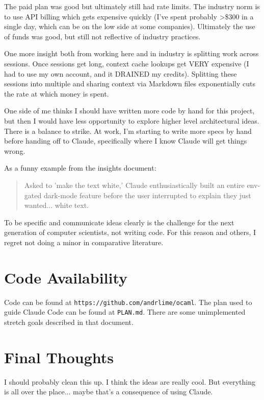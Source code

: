 \documentclass[sigconf]{acmart}
\begin{document}
The paid plan was good but ultimately still had rate limits. The industry norm is to use API billing which gets expensive quickly (I've spent probably >\$300 in a single day, which can be on the low side at some companies). Ultimately the use of funds was good, but still not reflective of industry practices.

One more insight both from working here and in industry is splitting work across sessions. Once sessions get long, context cache lookups get VERY expensive (I had to use my own account, and it DRAINED my credits). Splitting these sessions into multiple and sharing context via Markdown files exponentially cuts the rate at which money is spent.

One side of me thinks I should have written more code by hand for this project, but then I would have less opportunity to explore higher level architectural ideas. There is a balance to strike. At work, I'm starting to write more specs by hand before handing off to Claude, specifically where I know Claude will get things wrong.

As a funny example from the insights document:
\begin{quote}
  Asked to 'make the text white,' Claude enthusiastically built an entire env-gated dark-mode feature before the user interrupted to explain they just wanted... white text.
\end{quote}
To be specific and communicate ideas clearly is the challenge for the next generation of computer scientists, not writing code. For this reason and others, I regret not doing a minor in comparative literature.

\section{Code Availability}
Code can be found at \texttt{https://github.com/andrlime/ocaml}. The plan used to guide Claude Code can be found at \texttt{PLAN.md}. There are some unimplemented stretch goals described in that document.

\section{Final Thoughts}
I should probably clean this up. I think the ideas are really cool. But everything is all over the place... maybe that's a consequence of using Claude.
\end{document}
